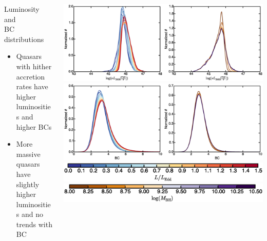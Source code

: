 \documentclass[landscape,9pt]{beamer}
\begin{document}
\begin{frame}
	\begin{columns}
	\begin{column}{.35\textwidth}
		\begin{block}{Luminosity and \\ BC distributions}
		\begin{itemize}
			\item Quasars with hither accretion rates have higher luminosities and higher BCs
			\item More massive quasars have slightly higher luminosities and no trends with BC
		\end{itemize}
		\end{block}
	\end{column}
	\begin{column}{.75\textwidth}
		\includegraphics[width=\textwidth]{../images/BH/f8a}\\
		\includegraphics[width=\textwidth]{../images/BH/f8b}\\
		\hspace{2mm}\includegraphics[width=.47\textwidth]{../images/BH/Lf_colorbar} 
		\hspace{2.5mm}\includegraphics[width=.47\textwidth]{../images/BH/M_colorbar}
	\end{column}
	\end{columns}
\end{frame}
\end{document}
